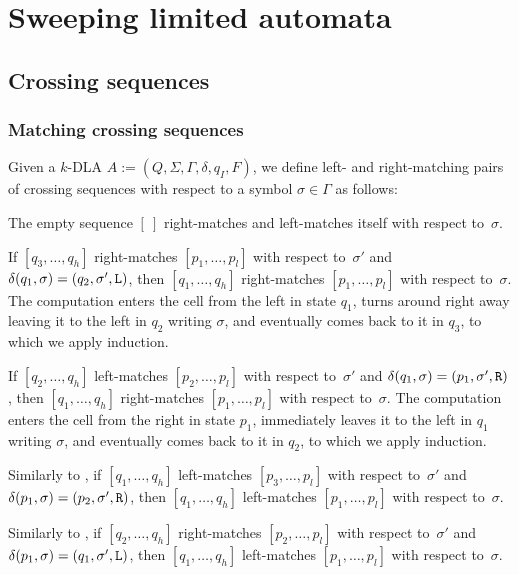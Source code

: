 \chapter{Sweeping limited automata}



\section{Crossing sequences}


\subsection{Matching crossing sequences}
\begin{defn}
	Given a $k$-DLA $A:=(Q,\Sigma,\Gamma,\delta,q_I,F)$, we define left- and right-matching pairs of crossing sequences with respect to a symbol $\sigma\in\Gamma$ as follows:
	\begin{rules}
		\item \label{itm:crossmatchswepDLA-1} The empty sequence $[~]$ right-matches and left-matches itself with respect to~$\sigma$.
		\item \label{itm:crossmatchswepDLA-2} If $[q_3,\dots,q_h]$ right-matches $[p_1,\dots,p_l]$ with respect to~$\sigma'$ and $\delta(q_1,\sigma)=(q_2,\sigma',\mathtt L)$, then $[q_1,\dots,q_h]$ right-matches $[p_1,\dots,p_l]$ with respect to~$\sigma$.
		The computation enters the cell from the left in state $q_1$, turns around right away leaving it to the left in $q_2$ writing $\sigma$, and eventually comes back to it in $q_3$, to which we apply induction.
		\item \label{itm:crossmatchswepDLA-3} If $[q_2,\dots,q_h]$ left-matches $[p_2,\dots,p_l]$ with respect to~$\sigma'$ and $\delta(q_1,\sigma)=(p_1,\sigma',\mathtt R)$, then $[q_1,\dots,q_h]$ right-matches $[p_1,\dots,p_l]$ with respect to~$\sigma$.
		The computation enters the cell from the right in state $p_1$, immediately leaves it to the left in $q_1$ writing $\sigma$, and eventually comes back to it in $q_2$, to which we apply induction.
		\item \label{itm:crossmatchswepDLA-4} Similarly to , if $[q_1,\dots,q_h]$ left-matches $[p_3,\dots,p_l]$ with respect to~$\sigma'$ and $\delta(p_1,\sigma)=(p_2,\sigma',\mathtt R)$, then $[q_1,\dots,q_h]$ left-matches $[p_1,\dots,p_l]$ with respect to~$\sigma$.
		\item \label{itm:crossmatchswepDLA-5} Similarly to , if $[q_2,\dots,q_h]$ right-matches $[p_2,\dots,p_l]$ with respect to~$\sigma'$ and $\delta(p_1,\sigma)=(q_1,\sigma',\mathtt L)$, then $[q_1,\dots,q_h]$ left-matches $[p_1,\dots,p_l]$ with respect to~$\sigma$.
	\end{rules}
\end{defn}

